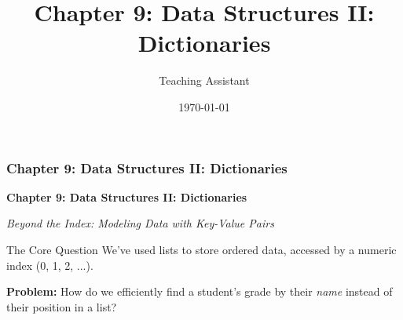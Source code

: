 \documentclass{beamer}
\title{Chapter 9: Data Structures II: Dictionaries}
\author{Teaching Assistant}
\institute{University Name}
\date{\today}
\begin{document}
\frame{\titlepage}

\begin{frame}[fragile]
    \frametitle{Chapter 9: Data Structures II: Dictionaries}
    
    \begin{center}
        \huge{\textbf{Chapter 9: Data Structures II: Dictionaries}}
        \vspace{1em}
        
        \large{\textit{Beyond the Index: Modeling Data with Key-Value Pairs}}
    \end{center}
    
    \vfill
    
    \begin{block}{The Core Question}
        We've used lists to store ordered data, accessed by a numeric index (0, 1, 2, ...).
        \vspace{0.5em}
        
        \textbf{Problem:} How do we efficiently find a student's grade by their \textit{name} instead of their position in a list?
    \end{block}
    
\end{frame}
\end{document}
